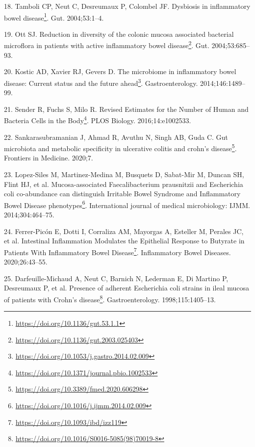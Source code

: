 \documentclass[
  12pt,
  a4paper,
  twoside,
  openright]{book}
\DeclareRobustCommand{\href}[2]{#2\footnote{\url{#1}}}
\newlength{\cslhangindent}
\newlength{\cslentryspacingunit} %
\newenvironment{CSLReferences}[2] %
 {%
  \setlength{\parindent}{0pt}
  \ifodd #1
  \let\oldpar\par
  \def\par{\hangindent=\cslhangindent\oldpar}
  \fi
  \setlength{\parskip}{#2\cslentryspacingunit}
 }%
 {}
\begin{document}
\begin{CSLReferences}{0}{0}
\leavevmode{}%
18. Tamboli CP, Neut C, Desreumaux P, Colombel JF. \href{https://doi.org/10.1136/gut.53.1.1}{Dysbiosis in inflammatory bowel disease}. Gut. 2004;53:1--4.

\leavevmode{}%
19. Ott SJ. \href{https://doi.org/10.1136/gut.2003.025403}{Reduction in diversity of the colonic mucosa associated bacterial microflora in patients with active inflammatory bowel disease}. Gut. 2004;53:685--93.

\leavevmode{}%
20. Kostic AD, Xavier RJ, Gevers D. \href{https://doi.org/10.1053/j.gastro.2014.02.009}{The microbiome in inflammatory bowel disease: Current status and the future ahead}. Gastroenterology. 2014;146:1489--99.

\leavevmode{}%
21. Sender R, Fuchs S, Milo R. \href{https://doi.org/10.1371/journal.pbio.1002533}{Revised Estimates for the Number of Human and Bacteria Cells in the Body}. PLOS Biology. 2016;14:e1002533.

\leavevmode{}%
22. Sankarasubramanian J, Ahmad R, Avuthu N, Singh AB, Guda C. \href{https://doi.org/10.3389/fmed.2020.606298}{Gut microbiota and metabolic specificity in ulcerative colitis and crohn's disease}. Frontiers in Medicine. 2020;7.

\leavevmode{}%
23. Lopez-Siles M, Martinez-Medina M, Busquets D, Sabat-Mir M, Duncan SH, Flint HJ, et al. \href{https://doi.org/10.1016/j.ijmm.2014.02.009}{Mucosa-associated Faecalibacterium prausnitzii and Escherichia coli co-abundance can distinguish Irritable Bowel Syndrome and Inflammatory Bowel Disease phenotypes}. International journal of medical microbiology: IJMM. 2014;304:464--75.

\leavevmode{}%
24. Ferrer-Picón E, Dotti I, Corraliza AM, Mayorgas A, Esteller M, Perales JC, et al. \href{https://doi.org/10.1093/ibd/izz119}{Intestinal Inflammation Modulates the Epithelial Response to Butyrate in Patients With Inflammatory Bowel Disease}. Inflammatory Bowel Diseases. 2020;26:43--55.

\leavevmode{}%
25. Darfeuille-Michaud A, Neut C, Barnich N, Lederman E, Di Martino P, Desreumaux P, et al. \href{https://doi.org/10.1016/S0016-5085(98)70019-8}{Presence of adherent Escherichia coli strains in ileal mucosa of patients with Crohn's disease}. Gastroenterology. 1998;115:1405--13.


\end{CSLReferences}
\end{document}
